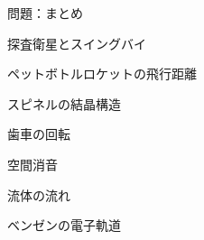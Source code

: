 \documentclass[dvipdfmx]{beamer}
\newenvironment{wideitemize}{\itemize\setlength{\itemsep}{1em}}{\enditemize}
\begin{document}

\begin{frame}{問題：まとめ}
\begin{wideitemize}
\item 探査衛星とスイングバイ
\item ペットボトルロケットの飛行距離
\item スピネルの結晶構造
\item 歯車の回転
\item 空間消音
\item 流体の流れ
\item ベンゼンの電子軌道
\end{wideitemize}
\end{frame}
\end{document}

